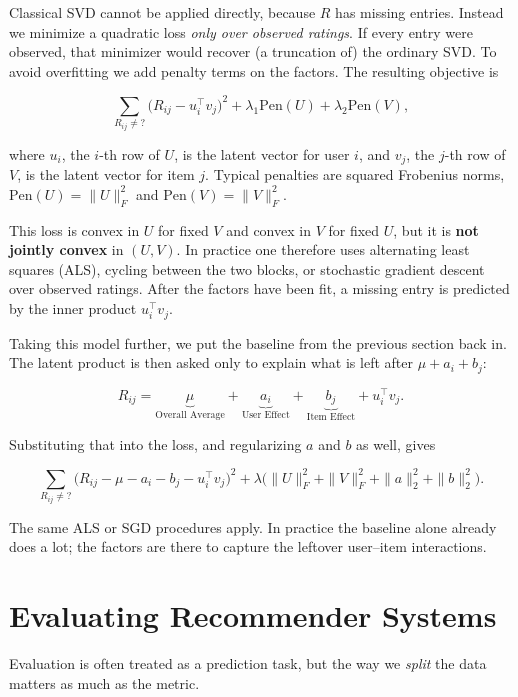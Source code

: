 \documentclass[
]{book}
\begin{document}
Classical SVD cannot be applied directly, because \(R\) has missing entries. Instead we minimize a quadratic loss \emph{only over observed ratings}. If every entry were observed, that minimizer would recover (a truncation of) the ordinary SVD. To avoid overfitting we add penalty terms on the factors. The resulting objective is

\[
\sum_{R_{ij} \neq ?} \bigl(R_{ij} - u_i^{\top} v_j\bigr)^2 + \lambda_1 \mathrm{Pen}(U) + \lambda_2 \mathrm{Pen}(V),
\]

where \(u_i\), the \(i\)-th row of \(U\), is the latent vector for user \(i\), and \(v_j\), the \(j\)-th row of \(V\), is the latent vector for item \(j\). Typical penalties are squared Frobenius norms, \(\mathrm{Pen}(U)=\|U\|_F^2\) and \(\mathrm{Pen}(V)=\|V\|_F^2\).

This loss is convex in \(U\) for fixed \(V\) and convex in \(V\) for fixed \(U\), but it is \textbf{not jointly convex} in \((U,V)\). In practice one therefore uses alternating least squares (ALS), cycling between the two blocks, or stochastic gradient descent over observed ratings. After the factors have been fit, a missing entry is predicted by the inner product \(u_i^{\top} v_j\).

Taking this model further, we put the baseline from the previous section back in. The latent product is then asked only to explain what is left after \(\mu + a_i + b_j\):

\[
R_{ij} = \underbrace{\mu}_{\text{Overall Average} } + \underbrace{a_i}_{\text{User Effect}} + \underbrace{b_j}_{\text{Item Effect}} + u_i^{\top} v_j.
\]

Substituting that into the loss, and regularizing \(a\) and \(b\) as well, gives

\[
\sum_{R_{ij} \neq ?}
\bigl(R_{ij} - \mu - a_i - b_j - u_i^{\top} v_j\bigr)^2
+ \lambda\bigl(\|U\|_F^2 + \|V\|_F^2 + \|a\|_2^2 + \|b\|_2^2\bigr).
\]

The same ALS or SGD procedures apply. In practice the baseline alone already does a lot; the factors are there to capture the leftover user--item interactions.

\section{Evaluating Recommender Systems}\label{evaluating-recommender-systems}

Evaluation is often treated as a prediction task, but the way we \emph{split} the data matters as much as the metric.
\end{document}
